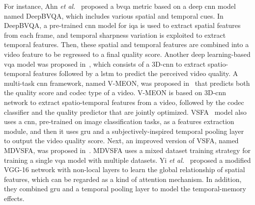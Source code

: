 \documentclass[journal]{IEEEtran}
\begin{document}
For instance, Ahn  \textit{et al.}~\cite{ahn2018deep} proposed a \ac{bvqa} metric based on a deep \ac{cnn} model named DeepBVQA,  which includes various spatial and temporal cues. In DeepBVQA, a pre-trained \ac{cnn} model for \ac{iqa} is used to extract spatial features from each frame, and temporal sharpness variation is exploited  to extract temporal features. Then, these spatial and temporal features are combined into a video feature to be regressed to a final quality score. Another deep learning-based \ac{vqa} model was proposed in~\cite{you2019deep}, which consists of a 3D-\ac{cnn} to extract spatio-temporal features followed by a \ac{lstm} to predict the perceived video quality. A multi-task \ac{cnn} framework, named V-MEON, was proposed in~\cite{liu2018end} that predicts both the quality score and codec type of a video. V-MEON is based on 3D-\ac{cnn} network to extract spatio-temporal
features from a video, followed by the codec classifier and the quality predictor that are jointly optimized. VSFA~\cite{li2019quality} model also uses a \ac{cnn}, pre-trained on image classification tasks, as a features extraction module, and then it uses \ac{gru} and a subjectively-inspired temporal pooling layer to output the video quality score. Next, an improved version of VSFA, named MDVSFA, was proposed in~\cite{li2021unified}. MDVSFA uses a mixed dataset training strategy for training a single \ac{vqa} model with multiple datasets. Yi \textit{et al.}~\cite{yi2021attention} proposed a modified VGG-16 network with non-local layers to learn the global relationship of spatial features, which can be regarded as a kind of attention mechanism. In addition, they combined \ac{gru} and a temporal pooling layer to model the temporal-memory effects.
\end{document}
